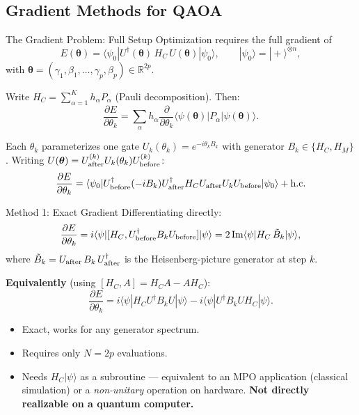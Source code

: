 \documentclass{beamer}
\begin{document}
\begin{frame}
\section{Gradient Methods for QAOA}

\begin{frame}{The Gradient Problem: Full Setup}
Optimization requires the full gradient of
\[
E(\boldsymbol{\theta})
= \langle\psi_0|U^\dagger(\boldsymbol{\theta})\,H_C\,U(\boldsymbol{\theta})|\psi_0\rangle,
\qquad
|\psi_0\rangle = |+\rangle^{\otimes n},
\]
with $\boldsymbol{\theta} = (\gamma_1,\beta_1,\dots,\gamma_p,\beta_p)\in\mathbb{R}^{2p}$.

\medskip

Write $H_C = \sum_{\alpha=1}^K h_\alpha P_\alpha$ (Pauli decomposition). Then:
\[
\frac{\partial E}{\partial\theta_k}
= \sum_\alpha h_\alpha
\frac{\partial}{\partial\theta_k}
\langle\psi(\boldsymbol{\theta})|P_\alpha|\psi(\boldsymbol{\theta})\rangle.
\]

Each $\theta_k$ parameterizes one gate $U_k(\theta_k) = e^{-i\theta_k B_k}$
with generator $B_k \in \{H_C, H_M\}$.
Writing $U(\boldsymbol{\theta}) = U_{\rm after}^{(k)} U_k(\theta_k) U_{\rm before}^{(k)}$:
\[
\frac{\partial E}{\partial\theta_k}
= \langle\psi_0|U_{\rm before}^\dagger (-iB_k) U_{\rm after}^\dagger H_C
U_{\rm after} U_k U_{\rm before}|\psi_0\rangle + \mathrm{h.c.}
\]
\end{frame}


\begin{frame}{Method 1: Exact Gradient}
Differentiating directly:
\[
\frac{\partial E}{\partial\theta_k}
= i\langle\psi|[H_C, U_{\rm before}^\dagger B_k U_{\rm before}]|\psi\rangle
= 2\,\mathrm{Im}\langle\psi|H_C\,\tilde{B}_k|\psi\rangle,
\]
where $\tilde{B}_k = U_{\rm after}\,B_k\,U_{\rm after}^\dagger$ is the
Heisenberg-picture generator at step $k$.

\medskip

\textbf{Equivalently} (using $[H_C, A] = H_CA - AH_C$):
\[
\frac{\partial E}{\partial\theta_k}
= i\langle\psi|H_C U^\dagger B_k U|\psi\rangle
- i\langle\psi|U^\dagger B_k U H_C|\psi\rangle.
\]

\begin{itemize}
\item[\textbf{+}] Exact, works for any generator spectrum.
\item[\textbf{+}] Requires only $N = 2p$ evaluations.
\item[\textbf{--}] Needs $H_C|\psi\rangle$ as a subroutine ---
  equivalent to an MPO application (classical simulation) or
  a \emph{non-unitary} operation on hardware.
  \textbf{Not directly realizable on a quantum computer.}
\end{itemize}
\end{frame}


\end{frame}
\end{document}
